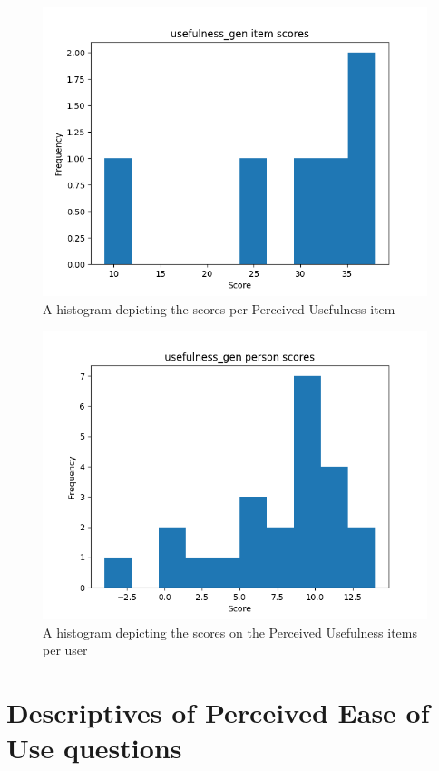 \begin{figure}
    \includegraphics[width=\textwidth]{img/usefulness_gen_diff.png}
    \caption{A histogram depicting the scores per Perceived Usefulness item}
    \label{fig:usefulness_gen_diff}
\end{figure}
\begin{figure}
    \includegraphics[width=\textwidth]{img/usefulness_gen_abil.png}
    \caption{A histogram depicting the scores on the Perceived Usefulness items per user}
    \label{fig:usefulness_gen_abil}
\end{figure}

\FloatBarrier
\section{Descriptives of Perceived Ease of Use questions}\label{ease-of-use}

